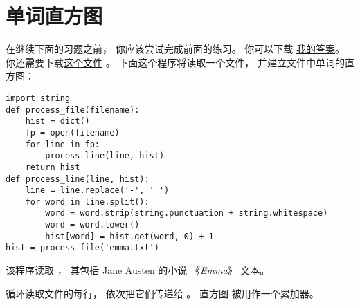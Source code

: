 \section{单词直方图}


在继续下面的习题之前， 你应该尝试完成前面的练习。
你可以下载 \href{http://thinkpython2.com/code/analyze_book1.py}{我的答案}。
你还需要下载\href{http://thinkpython2.com/code/emma.txt}{这个文件} 。
下面这个程序将读取一个文件， 并建立文件中单词的直方图：


\begin{lstlisting}
import string
def process_file(filename):
    hist = dict()
    fp = open(filename)
    for line in fp:
        process_line(line, hist)
    return hist
def process_line(line, hist):
    line = line.replace('-', ' ')
    for word in line.split():
        word = word.strip(string.punctuation + string.whitespace)
        word = word.lower()
        hist[word] = hist.get(word, 0) + 1
hist = process_file('emma.txt')
\end{lstlisting}


该程序读取  ， 其包括 Jane Austen 的小说 《{\em Emma}》 文本。



 循环读取文件的每行， 依次把它们传递给  。
直方图  被用作一个累加器。



